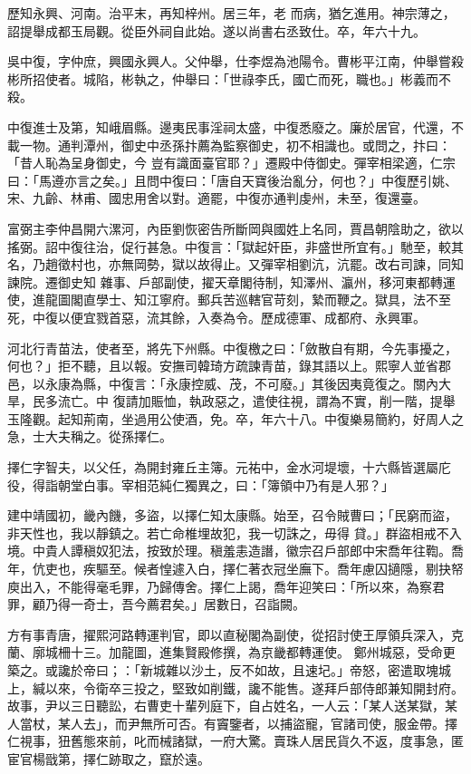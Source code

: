 \begin{pinyinscope}
 歷知永興、河南。治平末，再知梓州。居三年，老
 而病，猶乞進用。神宗薄之，詔提舉成都玉局觀。從臣外祠自此始。遂以尚書右丞致仕。卒，年六十九。



 吳中復，字仲庶，興國永興人。父仲舉，仕李煜為池陽令。曹彬平江南，仲舉嘗殺彬所招使者。城陷，彬執之，仲舉曰：「世祿李氏，國亡而死，職也。」彬義而不殺。



 中復進士及第，知峨眉縣。邊夷民事淫祠太盛，中復悉廢之。廉於居官，代還，不載一物。通判潭州，御史中丞孫抃薦為監察御史，初不相識也。或問之，抃曰：「昔人恥為呈身御史，今
 豈有識面臺官耶？」遷殿中侍御史。彈宰相梁適，仁宗曰：「馬遵亦言之矣。」且問中復曰：「唐自天寶後治亂分，何也？」中復歷引姚、宋、九齡、林甫、國忠用舍以對。適罷，中復亦通判虔州，未至，復還臺。



 富弼主李仲昌開六漯河，內臣劉恢密告所斷岡與國姓上名同，賈昌朝陰助之，欲以搖弼。詔中復往治，促行甚急。中復言：「獄起奸臣，非盛世所宜有。」馳至，較其名，乃趙徵村也，亦無岡勢，獄以故得止。又彈宰相劉沆，沆罷。改右司諫，同知諫院。遷御史知
 雜事、戶部副使，擢天章閣待制，知澤州、瀛州，移河東都轉運使，進龍圖閣直學士、知江寧府。郵兵苦巡轄官苛刻，縶而鞭之。獄具，法不至死，中復以便宜戮首惡，流其餘，入奏為令。歷成德軍、成都府、永興軍。



 河北行青苗法，使者至，將先下州縣。中復檄之曰：「斂散自有期，今先事擾之，何也？」拒不聽，且以報。安撫司韓琦方疏諫青苗，錄其語以上。熙寧人並省郡邑，以永康為縣，中復言：「永康控威、茂，不可廢。」其後因夷竟復之。關內大旱，民多流亡。中
 復請加賑恤，執政惡之，遣使往視，謂為不實，削一階，提舉玉隆觀。起知荊南，坐過用公使酒，免。卒，年六十八。中復樂易簡約，好周人之急，士大夫稱之。從孫擇仁。



 擇仁字智夫，以父任，為開封雍丘主簿。元祐中，金水河堤壞，十六縣皆選屬庀役，得詣朝堂白事。宰相范純仁獨異之，曰：「簿領中乃有是人邪？」



 建中靖國初，畿內饑，多盜，以擇仁知太康縣。始至，召令賊曹曰；「民窮而盜，非天性也，我以靜鎮之。若亡命椎埋故犯，我一切誅之，毋得
 貸。」群盜相戒不入境。中貴人譚稹奴犯法，按致於理。稹羞恚造譖，徽宗召戶部郎中宋喬年往鞫。喬年，伉吏也，疾驅至。候者惶遽入白，擇仁著衣冠坐廡下。喬年慮囚擿隱，剔抉帑庾出入，不能得毫毛罪，乃歸傳舍。擇仁上謁，喬年迎笑曰：「所以來，為察君罪，顧乃得一奇士，吾今薦君矣。」居數日，召詣闕。



 方有事青唐，擢熙河路轉運判官，即以直秘閣為副使，從招討使王厚領兵深入，克蘭、廓城柵十三。加龍圖，進集賢殿修撰，為京畿都轉運使。
 鄭州城惡，受命更築之。或讒於帝曰；：「新城雜以沙土，反不如故，且速圮。」帝怒，密遣取塊城上，緘以來，令衛卒三投之，堅致如削鐵，讒不能售。遂拜戶部侍郎兼知開封府。故事，尹以三日聽訟，右曹吏十輩列庭下，自占姓名，一人云：「某人送某獄，某人當杖，某人去」，而尹無所可否。有竇鑒者，以捕盜寵，官諸司使，服金帶。擇仁視事，狃舊態來前，叱而械諸獄，一府大驚。賣珠人居民貨久不返，度事急，匿宦官楊戩第，擇仁跡取之，竄於遠。




\end{pinyinscope}
